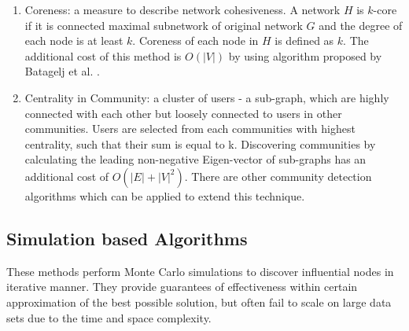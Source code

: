 \begin{enumerate}
			
			\item Coreness: a measure to describe network cohesiveness. A network $H$ is $k$-core if it is connected maximal subnetwork of original network $G$ and the degree of each node is at least $k$. Coreness of each node in $H$ is defined as $k$. The additional cost of this method is $O(|V|)$ by using algorithm proposed by Batagelj et al. \cite{batagelj2003}.
			
			\item Centrality in Community: a cluster of users - a sub-graph, which are highly connected with each other but loosely connected to users in other communities. Users are selected from each communities with highest centrality, such that their sum is equal to k. Discovering communities by calculating the leading non-negative Eigen-vector of sub-graphs \cite{newman2006b} has an additional cost of $O(|E|+|V|^2)$. There are other community detection algorithms which can be applied to extend this technique.
			
		\end{enumerate}
		
		\subsection{Simulation based Algorithms}
		These methods perform Monte Carlo simulations to discover influential nodes in iterative manner. They provide guarantees of effectiveness within certain approximation of the best possible solution, but often fail to scale on large data sets due to the time and space complexity.
		
